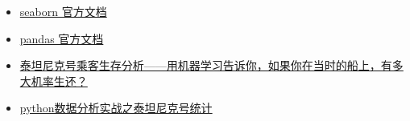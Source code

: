 \documentclass[11pt]{article}
\providecommand{\tightlist}{%
      \setlength{\itemsep}{0pt}\setlength{\parskip}{0pt}}
\begin{document}
\begin{itemize}
\tightlist
\item
  \href{http://seaborn.pydata.org}{seaborn 官方文档}
\item
  \href{http://pandas.pydata.org}{pandas 官方文档}
\item
  \href{https://www.jianshu.com/p/9a5bce0de13f?utm_campaign=maleskine\&utm_content=note\&utm_medium=seo_notes\&utm_source=recommendation}{泰坦尼克号乘客生存分析------用机器学习告诉你，如果你在当时的船上，有多大机率生还？}
\item
  \href{http://blog.51cto.com/youerning/1711371}{python数据分析实战之泰坦尼克号统计}
\end{itemize}


    
    
    
    
\end{document}
